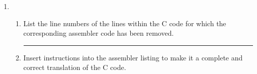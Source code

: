 \documentclass[a4paper,10pt]{article}
\begin{document}
\begin{enumerate}
\newpage
\item \begin{enumerate}
\item List the line numbers of the lines within the C code for which the corresponding assembler code has been removed.
\vspace{3mm}\hrule\vspace{3mm}

\item Insert instructions into the assembler listing to make it a complete and correct translation of the C code.
\begin{center}
\end{center}
\end{enumerate}




\end{enumerate}
\end{document}

